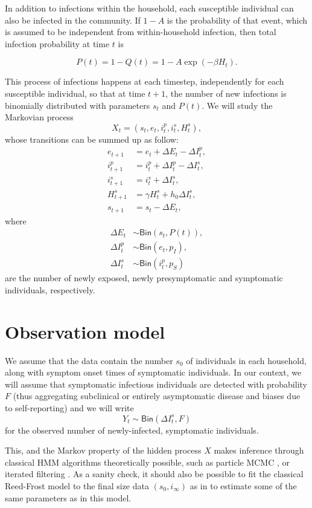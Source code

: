 \documentclass[a4paper]{article}
\begin{document}
In addition to infections within the household, each susceptible individual can
also be infected in the community. If \(1-A\) is the probability of that event,
which is assumed to be independent from within-household infection, then total
infection probability at time \(t\) is 

\[
	P(t)=1-Q(t) = 1-A\exp(-\beta H_t).
\]

This process of infections happens at each timestep, independently for each
susceptible individual, so that at time \(t+1\), the number of new infections is
binomially distributed with parameters \(s_t\) and \(P(t)\). We will study the
Markovian process
\begin{equation}
	X_t=(s_t,e_t,i^p_t,i_t^s,H_t^s),
\end{equation}
whose transitions can be summed up as follow:
\begin{align*}
	e_{t+1} & = e_t + \Delta E_t - \Delta I^p_t, \\
	i_{t+1}^p & = i_{t}^p +\Delta I^p_t - \Delta I_t^s, \\
	i_{t+1}^s & = i_t^s +\Delta I_t^s, \\
	H_{t+1}^s & = \gamma H_t^s + h_0 \Delta I_t^s, \\
	s_{t+1} & = s_t - \Delta E_t,
\end{align*}
where 
\begin{align*}
	\Delta E_t & \sim \mathsf{Bin}(s_t,P(t)),\\
	\Delta I^p_t & \sim \mathsf{Bin}(e_t,p_I),\\
	\Delta I^s_t & \sim \mathsf{Bin}(i^p_t,p_S)
\end{align*}
are the number of newly exposed, newly presymptomatic and symptomatic
individuals, respectively.

\section*{Observation model}

We assume that the data contain the number \(s_0\) of individuals in each
household, along with symptom onset times of symptomatic individuals. In our
context, we will assume that symptomatic infectious individuals are detected
with probability \(F\) (thus aggregating subclinical or entirely asymptomatic
disease and biases due to self-reporting) and we will write 
\[
	Y_t \sim \mathsf{Bin}(\Delta I_t^s,F)
\]
for the observed number of newly-infected, symptomatic individuals. 

This, and the Markov property of the hidden process \(X\) makes inference 
through classical HMM algorithms theoretically possible, such as particle MCMC 
\cite{Endo2019}, or iterated filtering \cite{Ionides2015}. As a sanity check, 
it should also be possible to fit the classical Reed-Frost model to the final 
size data \((s_0,i_\infty)\) as in \cite{Cauchemez2014} to estimate some of the 
same parameters as in this model.
\end{document}
